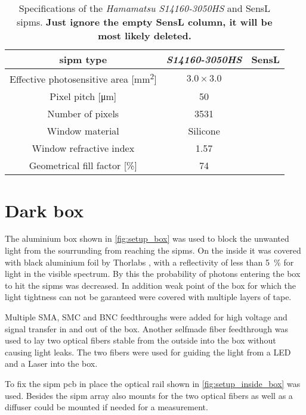 \begin{table}[]
    \centering
	\caption[Hamamatsu S14160-3050HS SiPM specifications]{Specifications of the \textit{Hamamatsu S14160-3050HS} and SensL \ac{sipm}s. \textbf{Just ignore the empty SensL column, it will be most likely deleted.} \cite{HAMsipm_ds} \cite{SensL_datasheet}}
    \begin{tabular}{c|c|c}
        \ac{sipm} type & \textit{S14160-3050HS} & SensL \\\hline
        Effective photosensitive area [\si{\square\milli\meter}] & $3.0\times 3.0$ & \\
        Pixel pitch [\si{\micro\meter}] & 50 & \\
        Number of pixels & 3531 & \\
        Window material & Silicone & \\
        Window refractive index & 1.57 & \\
        Geometrical fill factor [\si{\percent}] & 74 & 
    \end{tabular}
    \label{tab:sipm_specs}
\end{table}



\section{Dark box}
The aluminium box shown in \autoref{fig:setup_box} was used to block the unwanted light from the sourrunding from reaching the \ac{sipm}s.
On the inside it was covered with black aluminium foil by Thorlabs \cite{thorlabs_aluminium}, with a reflectivity of less than \SI{5}{\percent} for light in the visible spectrum.
By this the probability of photons entering the box to hit the \ac{sipm}s was decreased.
In addition weak point of the box for which the light tightness can not be garanteed were covered with multiple layers of tape.

Multiple SMA, SMC and BNC feedthroughs were added for high voltage and signal transfer in and out of the box.
Another selfmade fiber feedthrough was used to lay two optical fibers stable from the outside into the box without causing light leaks. 
The two fibers were used for guiding the light from a LED and a Laser into the box.

To fix the \ac{sipm} \ac{pcb} in place the optical rail shown in \autoref{fig:setup_inside_box} was used. 
Besides the \ac{sipm} array also mounts for the two optical fibers as well as a diffuser \cite{thorlabs_diffusor} could be mounted if needed for a measurement.

